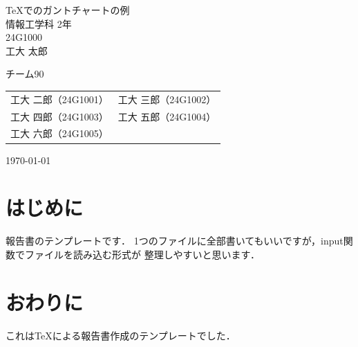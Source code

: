 \documentclass[uplatex,dvipdfmx]{jlreq}
\begin{document}
\begin{titlepage}
\vspace*{1cm}
\centering
\Huge\textsf{\TeX でのガントチャートの例}\\[2cm]
\Large\textsf{情報工学科 2年}\\
\Large\textsf{24G1000}\\[5pt]
\huge\textsf{工大 太郎}

\vspace*{1cm}
\Large\sffamily
\begin{itembox}[c]{チーム90}
\centering
\begin{tabular}{ll}
工大 二郎（24G1001）&
工大 三郎（24G1002）\\
工大 四郎（24G1003）&
工大 五郎（24G1004）\\
工大 六郎（24G1005）&\\
\end{tabular}
\end{itembox}

\vspace*{1cm}
\Large\textsf{\today}
\end{titlepage}
\clearpage

%
\section{はじめに}
報告書のテンプレートです．
1つのファイルに全部書いてもいいですが，input関数でファイルを読み込む形式が
整理しやすいと思います．

%
%
%
%
%

\section{おわりに}
これは{\TeX}による報告書作成のテンプレートでした．

%


\appendix
\renewcommand{\thefigure}{A.\arabic{figure}} %
\renewcommand{\thetable}{A.\arabic{table}}   %
\renewcommand{\theequation}{\Alph{section}.\arabic{equation}} %

%
\end{document}
